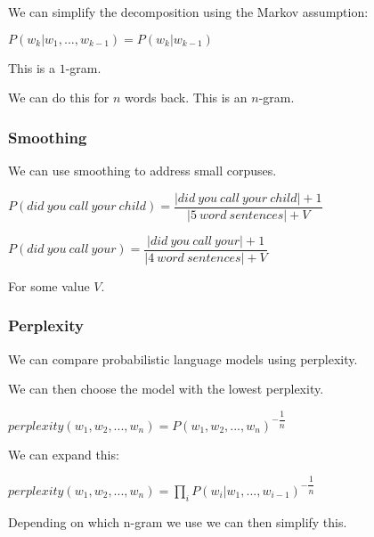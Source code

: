 We can simplify the decomposition using the Markov assumption:

\(P(w_k|w_1,...,w_{k-1})=P(w_k|w_{k-1})\)

This is a \(1\)-gram.

We can do this for \(n\) words back. This is an \(n\)-gram.

\subsubsection{Smoothing}

We can use smoothing to address small corpuses.

\(P(did\ you\ call\ your\ child)=\dfrac{|did\ you\ call\ your\ child|+1}{|5\ word\ sentences|+V}\)

\(P(did\ you\ call\ your)=\dfrac{|did\ you\ call\ your|+1}{|4\ word\ sentences|+V}\)

For some value \(V\).

\subsubsection{Perplexity}

We can compare probabilistic language models using perplexity.

We can then choose the model with the lowest perplexity.

\(perplexity(w_1, w_2, ..., w_n)=P(w_1, w_2, ..., w_n)^{-\dfrac{1}{n}}\)

We can expand this:

\(perplexity(w_1, w_2, ..., w_n)=\prod_i P(w_i| w_1, ..., w_{i-1})^{-\dfrac{1}{n}}\)

Depending on which n-gram we use we can then simplify this.

